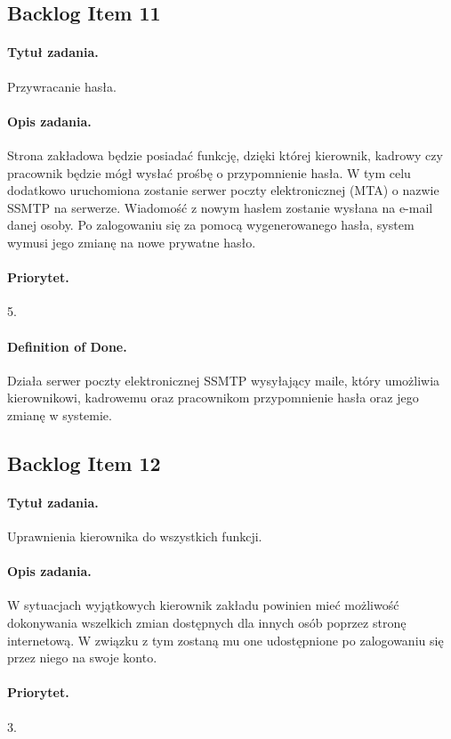 \documentclass[a4paper]{article}
\begin{document}
\subsection{Backlog Item 11}
\paragraph{Tytuł zadania.} Przywracanie hasła.
\paragraph{Opis zadania.} Strona zakładowa będzie posiadać funkcję, dzięki której kierownik, kadrowy czy pracownik będzie mógł wysłać prośbę o przypomnienie hasła. W tym celu dodatkowo uruchomiona zostanie serwer poczty elektronicznej (MTA) o nazwie SSMTP na serwerze. Wiadomość z nowym hasłem zostanie wysłana na e-mail danej osoby. Po zalogowaniu się za pomocą wygenerowanego hasła, system wymusi jego zmianę na nowe prywatne hasło.
\paragraph{Priorytet.} 5.
\paragraph{Definition of Done.} Działa serwer poczty elektronicznej SSMTP wysyłający maile, który umożliwia kierownikowi, kadrowemu oraz pracownikom przypomnienie hasła oraz jego zmianę w systemie.

\subsection{Backlog Item 12}
\paragraph{Tytuł zadania.} Uprawnienia kierownika do wszystkich funkcji.
\paragraph{Opis zadania.} W sytuacjach wyjątkowych kierownik zakładu powinien mieć możliwość dokonywania wszelkich zmian dostępnych dla innych osób poprzez stronę internetową. W związku z tym zostaną mu one udostępnione po zalogowaniu się przez niego na swoje konto. 
\paragraph{Priorytet.} 3.
\end{document}
